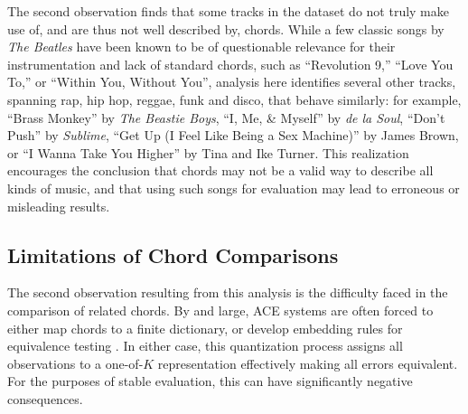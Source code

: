 \documentclass{article}
\begin{document}
The second observation finds that some tracks in the dataset do not truly make use of, and are thus not well described by, chords.
While a few classic songs by \emph{The Beatles} have been known to be of questionable relevance for their instrumentation and lack of standard chords, such as ``Revolution 9,'' ``Love You To,'' or ``Within You, Without You'', analysis here identifies several other tracks, spanning rap, hip hop, reggae, funk and disco, that behave similarly:
for example, ``Brass Monkey'' by \emph{The Beastie Boys}, ``I, Me, \& Myself'' by \emph{de la Soul}, ``Don't Push'' by \emph{Sublime}, ``Get Up (I Feel Like Being a Sex Machine)'' by James Brown, or ``I Wanna Take You Higher'' by Tina and Ike Turner.
This realization encourages the conclusion that chords may not be a valid way to describe all kinds of music, and that using such songs for evaluation may lead to erroneous or misleading results.



\subsection{Limitations of Chord Comparisons}

The second observation resulting from this analysis is the difficulty faced in the comparison of related chords.
By and large, ACE systems are often forced to either map chords to a finite dictionary, or develop embedding rules for equivalence testing \cite{Raffel2014Eval}.
In either case, this quantization process assigns all observations to a one-of-$K$ representation effectively making all errors equivalent.
For the purposes of stable evaluation, this can have significantly negative consequences.
\end{document}
